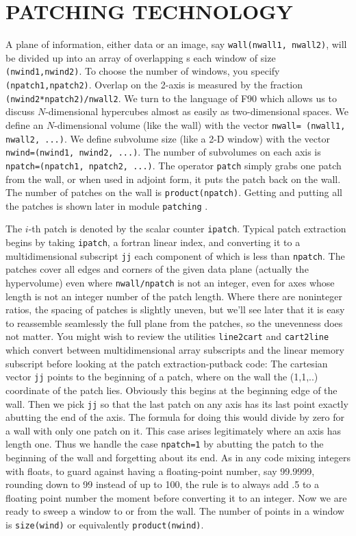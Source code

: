 \section{PATCHING TECHNOLOGY}
A plane of information, either data or an image,
say {\tt wall(nwall1, nwall2)}, will be divided up into
an array of overlapping s
each window of size {\tt (nwind1,nwind2)}.
To choose the number of windows, you specify {\tt (npatch1,npatch2)}.
Overlap on the 2-axis is measured by the fraction
{\tt (nwind2*npatch2)/nwall2}.
We turn to the language of F90 which allows us to discuss
$N$-dimensional hypercubes almost as easily as two-dimensional spaces.
We define an $N$-dimensional volume (like the wall) with the vector
\texttt{nwall= (nwall1, nwall2, ...)}.
We define subvolume size (like a 2-D window) with the vector
\texttt{nwind=(nwind1, nwind2, ...)}.
The number of subvolumes on each axis is
\texttt{npatch=(npatch1, npatch2, ...)}.
The operator
\texttt{patch} 
simply grabs one patch from the wall,
or when used in adjoint form, it puts the patch back on the wall.
The number of patches on the wall is
\texttt{product(npatch)}.
Getting and putting all the patches is shown later in module
\texttt{patching} .

\par
The $i$-th patch is denoted by the scalar counter \texttt{ipatch}.
Typical patch extraction begins by taking
\texttt{ipatch}, a fortran linear index,
and converting it to a multidimensional subscript \texttt{jj}
each component of which is less than \texttt{npatch}.
The patches cover all edges and corners of the given data plane
(actually the hypervolume)
even where
\texttt{nwall/npatch} is not an integer,
even for axes whose length is not an integer number of the patch length.
Where there are noninteger ratios,
the spacing of patches is slightly uneven,
but we'll see later that
it is easy to reassemble seamlessly the full plane from the patches,
so the unevenness does not matter.
You might wish to review the utilities
\texttt{line2cart} and
\texttt{cart2line} 
which convert between multidimensional array subscripts
and the linear memory subscript
before looking at the patch extraction-putback code:
The cartesian vector \texttt{jj}
points to the beginning of a patch, where on the wall
the (1,1,..) coordinate of the patch lies.
Obviously this begins at the beginning edge of the wall.
Then we pick \texttt{jj} so that the last patch on any axis
has its last point exactly abutting the end of the axis.
The formula for doing this would divide by zero
for a wall with only one patch on it.
This case arises legitimately where an axis has length one.
Thus we handle the case \texttt{npatch=1} by abutting the patch to the
beginning of the wall and forgetting about its end.
As in any code mixing integers with floats,
to guard against having a floating-point number, say 99.9999,
rounding down to 99 instead of up to 100,
the rule is to always add .5 to a floating point number
the moment before converting it to an integer.
Now we are ready to sweep a window to or from the wall.
The number of points in a window is 
\texttt{size(wind)} or equivalently
\texttt{product(nwind)}.

